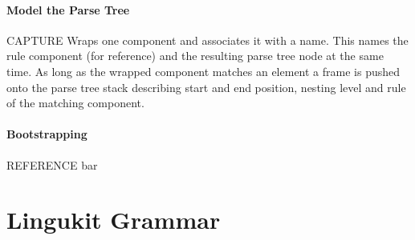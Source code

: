 \documentclass[10pt,a4paper]{article}
\begin{document}
\paragraph{Model the Parse Tree}
\begin{rulelist}
\item[CAPTURE] Wraps one component and associates it with a name. This names the rule component (for reference) and the resulting parse tree node at the same time. As long as the wrapped component matches an element a frame is pushed onto the parse tree stack describing start and end position, nesting level and rule of the matching component.
\end{rulelist}

\paragraph{Bootstrapping}
\begin{rulelist}
\item[REFERENCE] bar
\end{rulelist}

\section{Lingukit Grammar}
\end{document}
